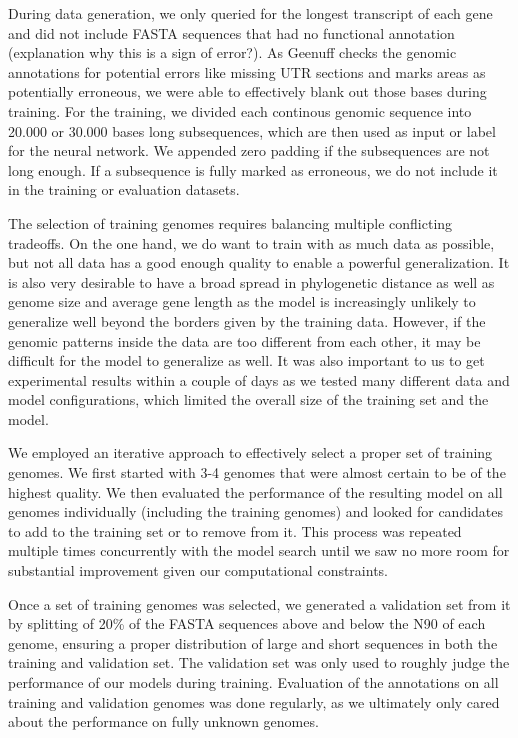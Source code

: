 \documentclass{bioinfo}
\begin{document}
\begin{methods}
During data generation, we only queried for the longest transcript of each gene and did not include FASTA sequences that had no functional annotation (explanation why this is a sign of error?). As Geenuff checks the genomic annotations for potential errors like missing UTR sections and marks areas as potentially erroneous, we were able to effectively blank out those bases during training. For the training, we divided each continous genomic sequence into 20.000 or 30.000 bases long subsequences, which are then used as input or label for the neural network. We appended zero padding if the subsequences are not long enough. If a subsequence is fully marked as erroneous, we do not include it in the training or evaluation datasets.

The selection of training genomes requires balancing multiple conflicting tradeoffs. On the one hand, we do want to train with as much data as possible, but not all data has a good enough quality to enable a powerful generalization. It is also very desirable to have a broad spread in phylogenetic distance as well as genome size and average gene length as the model is increasingly unlikely to generalize well beyond the borders given by the training data. However, if the genomic patterns inside the data are too different from each other, it may be difficult for the model to generalize as well. It was also important to us to get experimental results within a couple of days as we tested many different data and model configurations, which limited the overall size of the training set and the model. 
	
We employed an iterative approach to effectively select a proper set of training genomes. We first started with 3-4 genomes that were almost certain to be of the highest quality. We then evaluated the performance of the resulting model on all genomes individually (including the training genomes) and looked for candidates to add to the training set or to remove from it. This process was repeated multiple times concurrently with the model search until we saw no more room for substantial improvement given our computational constraints.

Once a set of training genomes was selected, we generated a validation set from it by splitting of 20\% of the FASTA sequences above and below the N90 of each genome, ensuring a proper distribution of large and short sequences in both the training and validation set. The validation set was only used to roughly judge the performance of our models during training. Evaluation of the annotations on all training and validation genomes was done regularly, as we ultimately only cared about the performance on fully unknown genomes.





\end{methods}
\end{document}
